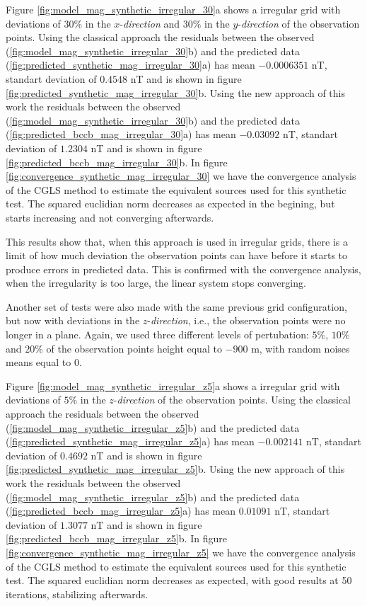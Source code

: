 Figure \ref{fig:model_mag_synthetic_irregular_30}a shows a irregular grid with deviations of $30\%$ in the $x$-\textit{direction} and $30\%$ in the $y$-\textit{direction} of the observation points. Using the classical approach the residuals between the observed (\ref{fig:model_mag_synthetic_irregular_30}b) and the predicted data (\ref{fig:predicted_synthetic_mag_irregular_30}a) has mean $-0.0006351$ nT, standart deviation of $0.4548$ nT and is shown in figure \ref{fig:predicted_synthetic_mag_irregular_30}b. Using the new approach of this work the residuals between the observed (\ref{fig:model_mag_synthetic_irregular_30}b) and the predicted data (\ref{fig:predicted_bccb_mag_irregular_30}a) has mean $-0.03092$ nT, standart deviation of $1.2304$ nT and is shown in figure \ref{fig:predicted_bccb_mag_irregular_30}b.
In figure \ref{fig:convergence_synthetic_mag_irregular_30} we have the convergence analysis of the CGLS method to estimate the equivalent sources used for this synthetic test. The squared euclidian norm decreases as expected in the begining, but starts increasing and not converging afterwards.

This results show that, when this approach is used in irregular grids, there is a limit of how much deviation the observation points can have before it starts to produce errors in predicted data. This is confirmed with the convergence analysis, when the irregularity is too large, the linear system stops converging.

Another set of tests were also made with the same previous grid configuration, but now with deviations in the $z$-\textit{direction}, i.e., the observation points were no longer in a plane. Again, we used three different levels of pertubation: $5\%$, $10\%$ and $20\%$ of the observation points height equal to $-900$ m, with random noises means equal to $0$.

Figure \ref{fig:model_mag_synthetic_irregular_z5}a shows a irregular grid with deviations of $5\%$ in the $z$-\textit{direction} of the observation points. Using the classical approach the residuals between the observed (\ref{fig:model_mag_synthetic_irregular_z5}b) and the predicted data (\ref{fig:predicted_synthetic_mag_irregular_z5}a) has mean $-0.002141$ nT, standart deviation of $0.4692$ nT and is shown in figure \ref{fig:predicted_synthetic_mag_irregular_z5}b. Using the new approach of this work the residuals between the observed (\ref{fig:model_mag_synthetic_irregular_z5}b) and the predicted data (\ref{fig:predicted_bccb_mag_irregular_z5}a) has mean $0.01091$ nT, standart deviation of $1.3077$ nT and is shown in figure \ref{fig:predicted_bccb_mag_irregular_z5}b.
In figure \ref{fig:convergence_synthetic_mag_irregular_z5} we have the convergence analysis of the CGLS method to estimate the equivalent sources used for this synthetic test. The squared euclidian norm decreases as expected, with good results at 50 iterations, stabilizing afterwards.

